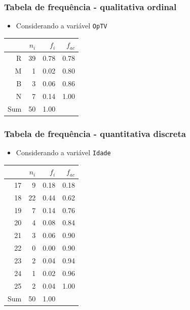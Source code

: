\documentclass[11pt]{beamer}
\begin{document}
\begin{frame}
\frametitle{Tabela de frequência - qualitativa ordinal}

\begin{itemize}
\item
  Considerando a variável \texttt{OpTV}
\end{itemize}

\begin{table}[ht]
\centering
\begin{tabular}{rrrr}
  \hline
 & $n_i$ & $f_i$ & $f_{ac}$ \\ 
  \hline
R & 39 & 0.78 & 0.78 \\ 
  M & 1 & 0.02 & 0.80 \\ 
  B & 3 & 0.06 & 0.86 \\ 
  N & 7 & 0.14 & 1.00 \\ 
   \hline
Sum & 50 & 1.00 &  \\ 
   \hline
\end{tabular}
\end{table}
\end{frame}

\begin{frame}
\frametitle{Tabela de frequência - quantitativa discreta}

\begin{itemize}
\item
  Considerando a variável \texttt{Idade}
\end{itemize}

\begin{table}[ht]
\centering
\begin{tabular}{rrrr}
  \hline
 & $n_i$ & $f_i$ & $f_{ac}$ \\ 
  \hline
17 & 9 & 0.18 & 0.18 \\ 
  18 & 22 & 0.44 & 0.62 \\ 
  19 & 7 & 0.14 & 0.76 \\ 
  20 & 4 & 0.08 & 0.84 \\ 
  21 & 3 & 0.06 & 0.90 \\ 
  22 & 0 & 0.00 & 0.90 \\ 
  23 & 2 & 0.04 & 0.94 \\ 
  24 & 1 & 0.02 & 0.96 \\ 
  25 & 2 & 0.04 & 1.00 \\ 
   \hline
Sum & 50 & 1.00 &  \\ 
   \hline
\end{tabular}
\end{table}
\end{frame}
\end{document}
